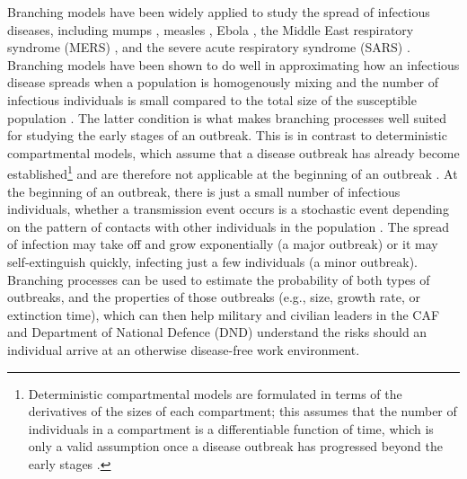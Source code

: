 \documentclass[sr]{drdc-report}
\begin{document}
 
Branching models have been widely applied to study the spread of infectious diseases, including mumps \cite{Ball}, measles \cite{Farrington}, Ebola \cite{Drake}, the Middle East respiratory syndrome (MERS) \cite{Chowell}, and the severe acute respiratory syndrome (SARS) \cite{Chowell}. Branching models have been shown to do well in approximating how an infectious disease spreads when a population is homogenously mixing and the number of infectious individuals is small compared to the total size of the susceptible population \cite{Ball}. The latter condition is what makes branching processes well suited for studying the early stages of an outbreak. This is in contrast to deterministic compartmental models, which assume that a disease outbreak has already become established{\footnote{Deterministic compartmental models are formulated in terms of the derivatives of the sizes of each compartment; this assumes that the number of individuals in a compartment is a differentiable function of time, which is only a valid assumption once a disease outbreak has progressed beyond the early stages \cite{Brauer}.}} and are therefore not applicable at the beginning of an outbreak \cite{Brauer}. At the beginning of an outbreak, there is just a small number of infectious individuals, whether a transmission event occurs is a stochastic event depending on the pattern of contacts with other individuals in the population \cite{Brauer}. The spread of infection may take off and grow exponentially (a major outbreak) or it may self-extinguish quickly, infecting just a few individuals (a minor outbreak). Branching processes can be used to estimate the probability of both types of outbreaks, and the properties of those outbreaks (e.g., size, growth rate, or extinction time), which can then help military and civilian leaders in the CAF and Department of National Defence (DND) understand the risks should an individual arrive at an otherwise disease-free work environment. 

  
\end{document}

